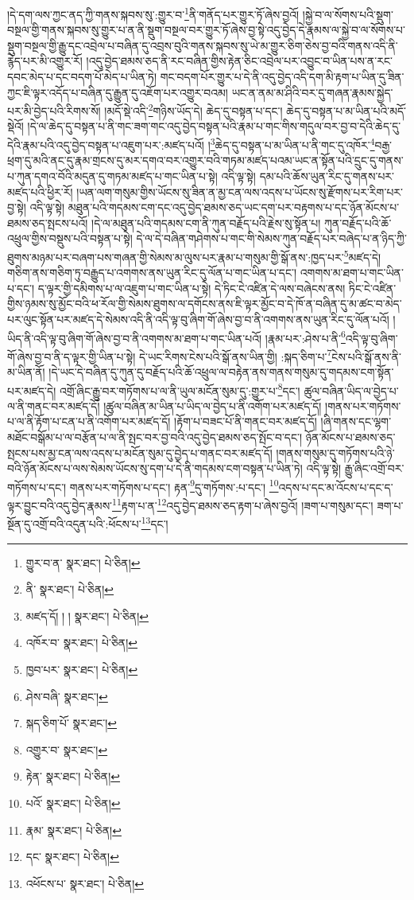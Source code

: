 །དེ་དག་ལས་ཀྱང་ནད་ཀྱི་གནས་སྐབས་སུ་:གྱུར་བ་\footnote{གྱུར་བ་ན་  སྣར་ཐང་།  པེ་ཅིན། }ནི་གནོད་པར་གྱུར་ཏོ་ཞེས་བྱའོ། །སྐྱེ་བ་ལ་སོགས་པའི་སྡུག་བསྔལ་གྱི་གནས་སྐབས་སུ་གྱུར་པ་ན་ནི་སྡུག་བསྔལ་བར་གྱུར་ཏོ་ཞེས་བྱ་སྟེ་འདུ་བྱེད་དེ་རྣམས་ལ་སྐྱེ་བ་ལ་སོགས་པ་སྡུག་བསྔལ་གྱི་རྒྱུ་དང་འབྲེལ་པ་བཞིན་དུ་འབྲས་བུའི་གནས་སྐབས་སུ་ཡེ་མ་གྱུར་ཅིག་ཅེས་བྱ་བའི་གནས་འདི་ནི་རྙེད་པར་མི་འགྱུར་རོ། །འདུ་བྱེད་ཐམས་ཅད་ནི་རང་བཞིན་གྱིས་རྟེན་ཅིང་འབྲེལ་པར་འབྱུང་བ་ཡིན་པས་ན་རང་དབང་མེད་པ་དང་བདག་པོ་མེད་པ་ཡིན་ཏེ། གང་བདག་པོར་གྱུར་པ་དེ་ནི་འདུ་བྱེད་འདི་དག་མི་རྟག་པ་ཡིན་དུ་ཟིན་ཀྱང་ཇི་ལྟར་འདོད་པ་བཞིན་དུ་རྒྱུན་དུ་འཇོག་པར་འགྱུར་བའམ། ཡང་ན་ནམ་མ་ཤིའི་བར་དུ་གཞན་རྣམས་སྐྱེད་པར་མི་བྱེད་པའི་རིགས་སོ། །མདོ་སྡེ་འདི་\footnote{ནི་  སྣར་ཐང་།  པེ་ཅིན། }གཉིས་ཡོད་དེ། ཆེད་དུ་བསྟན་པ་དང་། ཆེད་དུ་བསྟན་པ་མ་ཡིན་པའི་མདོ་སྡེའོ། །དེ་ལ་ཆེད་དུ་བསྟན་པ་ནི་གང་ཟག་གང་འདུ་བྱེད་བསྟན་པའི་རྣམ་པ་གང་གིས་གདུལ་བར་བྱ་བ་དེའི་ཆེད་དུ་དེའི་རྣམ་པའི་འདུ་བྱེད་བསྟན་པ་འཇུག་པར་:མཛད་པའོ། །\footnote{མཛད་དོ། ། །  སྣར་ཐང་།  པེ་ཅིན། }ཆེད་དུ་བསྟན་པ་མ་ཡིན་པ་ནི་གང་དུ་འཁོར་\footnote{འཁོར་བ་  སྣར་ཐང་།  པེ་ཅིན། }བརྒྱ་ཕྲག་དུ་མའི་ནང་དུ་རྣམ་གྲངས་དུ་མར་དགའ་བར་འགྱུར་བའི་གཏམ་མཛད་པའམ་ཡང་ན་སྟོན་པའི་དྲུང་དུ་གནས་པ་ཀུན་དགའ་བོའི་མདུན་དུ་གཏམ་མཛད་པ་གང་ཡིན་པ་སྟེ། འདི་ལྟ་སྟེ། དམ་པའི་ཆོས་ཡུན་རིང་དུ་གནས་པར་མཛད་པའི་ཕྱིར་རོ། །ཡན་ལག་གསུམ་གྱིས་ཡོངས་སུ་ཟིན་ན་མྱ་ངན་ལས་འདས་པ་ཡོངས་སུ་རྫོགས་པར་རིག་པར་བྱ་སྟེ། འདི་ལྟ་སྟེ། མཐུན་པའི་གདམས་ངག་དང་འདུ་བྱེད་ཐམས་ཅད་ཡང་དག་པར་བརྟགས་པ་དང་ཉོན་མོངས་པ་ཐམས་ཅད་སྤངས་པའོ། །དེ་ལ་མཐུན་པའི་གདམས་ངག་ནི་ཀུན་བརྗོད་པའི་རྗེས་སུ་སྟོན་པ། ཀུན་བརྗོད་པའི་ཆོ་འཕྲུལ་གྱིས་བསྡུས་པའི་བསྟན་པ་སྟེ། དེ་ལ་དེ་བཞིན་གཤེགས་པ་གང་གི་སེམས་ཀུན་བརྗོད་པར་བཞེད་པ་ན་ཉིད་ཀྱི་ཐུགས་མཉམ་པར་བཞག་པས་གཞན་གྱི་སེམས་མ་ལུས་པར་རྣམ་པ་གསུམ་གྱི་སྒོ་ནས་:ཁྱད་པར་\footnote{ཁྱབ་པར་  སྣར་ཐང་།  པེ་ཅིན། }མཛད་དེ། གཅིག་ནས་གཅིག་ཏུ་བརྒྱུད་པ་འགགས་ནས་ཡུན་རིང་དུ་ལོན་པ་གང་ཡིན་པ་དང་། འགགས་མ་ཐག་པ་གང་ཡིན་པ་དང་། ད་ལྟར་གྱི་དམིགས་པ་ལ་འཇུག་པ་གང་ཡིན་པ་སྟེ། དེ་ཏིང་ངེ་འཛིན་དེ་ལས་བཞེངས་ནས། ཏིང་ངེ་འཛིན་གྱིས་ཉམས་སུ་མྱོང་བའི་ཕ་རོལ་གྱི་སེམས་ཐུགས་ལ་དགོངས་ནས་ཇི་ལྟར་མྱོང་བ་དེ་ཁོ་ན་བཞིན་དུ་མ་ཚང་བ་མེད་པར་ལུང་སྟོན་པར་མཛད་དེ་སེམས་འདི་ནི་འདི་ལྟ་བུ་ཞིག་གོ་ཞེས་བྱ་བ་ནི་འགགས་ནས་ཡུན་རིང་དུ་ལོན་པའོ། །ཡིད་ནི་འདི་ལྟ་བུ་ཞིག་གོ་ཞེས་བྱ་བ་ནི་འགགས་མ་ཐག་པ་གང་ཡིན་པའོ། །རྣམ་པར་:ཤེས་པ་ནི་\footnote{ཤེས་བཞི་  སྣར་ཐང་། }འདི་ལྟ་བུ་ཞིག་གོ་ཞེས་བྱ་བ་ནི་ད་ལྟར་གྱི་ཡིན་པ་སྟེ། དེ་ཡང་རིགས་ངེས་པའི་སྒོ་ནས་ཡིན་གྱི། :སྐད་ཅིག་པ་\footnote{སྐད་ཅིག་པོ་  སྣར་ཐང་། }ངེས་པའི་སྒོ་ནས་ནི་མ་ཡིན་ནོ། །དེ་ཡང་དེ་བཞིན་དུ་ཀུན་དུ་བརྗོད་པའི་ཆོ་འཕྲུལ་ལ་བརྟེན་ནས་གནས་གསུམ་དུ་གདམས་ངག་སྟོན་པར་མཛད་དེ། འགྲོ་ཞིང་རྒྱུ་བར་གཏོགས་པ་ལ་ནི་ཡུལ་མངོན་སུམ་དུ་:གྱུར་པ་\footnote{འགྱུར་བ་  སྣར་ཐང་། }དང་། ཚུལ་བཞིན་ཡིད་ལ་བྱེད་པ་ལ་ནི་གནང་བར་མཛད་དོ། །ཚུལ་བཞིན་མ་ཡིན་པ་ཡིད་ལ་བྱེད་པ་ནི་འགོག་པར་མཛད་དོ། །གནས་པར་གཏོགས་པ་ལ་ནི་རྟོག་པ་ངན་པ་ནི་འགོག་པར་མཛད་དོ། །རྟོག་པ་བཟང་པོ་ནི་གནང་བར་མཛད་དོ། །ཞི་གནས་དང་ལྷག་མཐོང་བསྒོམ་པ་ལ་བརྩོན་པ་ལ་ནི་སྤང་བར་བྱ་བའི་འདུ་བྱེད་ཐམས་ཅད་སྤོང་བ་དང་། ཉོན་མོངས་པ་ཐམས་ཅད་སྤངས་པས་མྱ་ངན་ལས་འདས་པ་མངོན་སུམ་དུ་བྱེད་པ་གནང་བར་མཛད་དོ། །གནས་གསུམ་དུ་གཏོགས་པའི་ཉེ་བའི་ཉོན་མོངས་པ་ལས་སེམས་ཡོངས་སུ་དག་པ་དེ་ནི་གདམས་ངག་བསྟན་པ་ཡིན་ཏེ། འདི་ལྟ་སྟེ། རྒྱུ་ཞིང་འགྲོ་བར་གཏོགས་པ་དང་། གནས་པར་གཏོགས་པ་དང་། རྟན་\footnote{རྟེན་  སྣར་ཐང་།  པེ་ཅིན། }དུ་གཏོགས་:པ་དང་། \footnote{པའོ་  སྣར་ཐང་།  པེ་ཅིན། }འདས་པ་དང་མ་འོངས་པ་དང་ད་ལྟར་བྱུང་བའི་འདུ་བྱེད་རྣམས་\footnote{རྣམ་  སྣར་ཐང་།  པེ་ཅིན། }རྟག་པ་ན་\footnote{དང་  སྣར་ཐང་།  པེ་ཅིན། }འདུ་བྱེད་ཐམས་ཅད་རྟག་པ་ཞེས་བྱའོ། །ཟག་པ་གསུམ་དང་། ཟག་པ་སྔོན་དུ་འགྲོ་བའི་འདུན་པའི་:ཕོངས་པ་\footnote{འཕོངས་པ་  སྣར་ཐང་།  པེ་ཅིན། }དང་། 